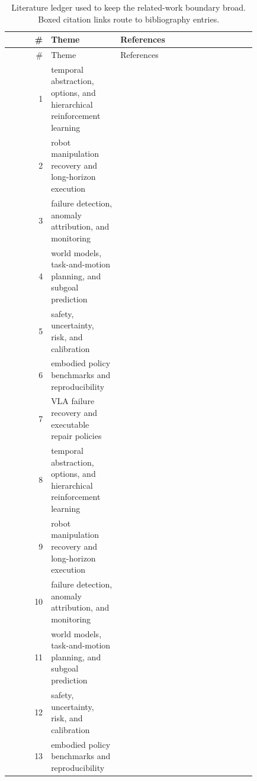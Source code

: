 \documentclass{article}
\begin{document}
\begin{longtable}{@{}r p{0.28\linewidth} p{0.55\linewidth}@{}}
\caption{Literature ledger used to keep the related-work boundary broad. Boxed citation links route to bibliography entries.}\\
\toprule
\# & Theme & References\\
\midrule
\endfirsthead
\toprule
\# & Theme & References\\
\midrule
\endhead
1 & temporal abstraction, options, and hierarchical reinforcement learning & \citep{sutton1999options,bacon2017option,nachum2018hiro} \\
2 & robot manipulation recovery and long-horizon execution & \citep{thananjeyan2020recovery,vats2024recoverychaining,lin2025failsafe} \\
3 & failure detection, anomaly attribution, and monitoring & \citep{huang2026hwm1,hedegaard2025beyond2,buamanee2026bihil3} \\
4 & world models, task-and-motion planning, and subgoal prediction & \citep{hu2026recovla4,mao2024robomatrix5,shen2026metaworld6} \\
5 & safety, uncertainty, risk, and calibration & \citep{park2025hierarchical7,lin2025failsafe8,ma2024hierarchical9} \\
6 & embodied policy benchmarks and reproducibility & \citep{lane2002task10,wolfe2010combined11,schakkal2025hierarchical12} \\
7 & VLA failure recovery and executable repair policies & \citep{chen2026reconvla13,berducci2025hprs14,sini2022a15} \\
8 & temporal abstraction, options, and hierarchical reinforcement learning & \citep{bhat2025grounding16,zrobek2026hierarchical17,gu2025safe18} \\
9 & robot manipulation recovery and long-horizon execution & \citep{kalluraya2023resilient19,kim2026hierarchical20,zhang2025dthrl21} \\
10 & failure detection, anomaly attribution, and monitoring & \citep{ginesi2020autonomous22,wei2025hierarchical23,dawson2023a24} \\
11 & world models, task-and-motion planning, and subgoal prediction & \citep{willibald2026hierarchical25,wang2026multimodal26,jaber2026hclsm27} \\
12 & safety, uncertainty, risk, and calibration & \citep{singhndstate28,wei2025hierarchical29,jin2022a30} \\
13 & embodied policy benchmarks and reproducibility & \citep{duan2024aha31,lee2025lazydash32,pham2024adaptive33} \\

\end{longtable}
\end{document}
